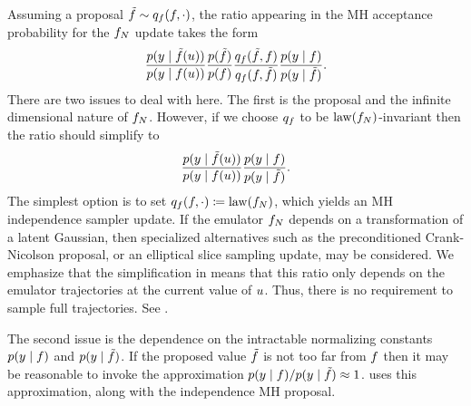 \documentclass[12pt]{article}
\begin{document}
 Assuming a proposal 
$\tilde{f} \sim q_{f}(f, \cdot)$, the ratio appearing in the MH acceptance
probability for the $f_{N}$ update takes the form 
\begin{align}
\frac{p(y \mid \tilde{f}(u))}{p(y \mid f(u))} \frac{p(\tilde{f})}{p(f)} 
\frac{q_{f}(\tilde{f}, f)}{q_{f}(f, \tilde{f})} \frac{p(y \mid f)}{p(y \mid \tilde{f})}.
\end{align}
There are two issues to deal with here. The first is the proposal and the infinite dimensional nature of $f_{N}$.
However, if we choose $q_f$ to be $\mathrm{law}(f_{N})$-invariant then the ratio should simplify to
\begin{align}
\frac{p(y \mid \tilde{f}(u))}{p(y \mid f(u))} \frac{p(y \mid f)}{p(y \mid \tilde{f})}.
\label{eq:MH-ratio-prior-invariant}
\end{align}
The simplest option is to set $q_f(f, \cdot) \coloneqq \mathrm{law}(f_{N})$, which yields an MH independence
sampler update. If the emulator $f_{N}$ depends on a transformation of a latent Gaussian, then 
specialized alternatives such as the preconditioned Crank-Nicolson proposal, or an elliptical slice
sampling update, may be considered. We emphasize that the simplification in 
 means that this ratio only depends on the emulator trajectories at the current 
value of $u$. Thus, there is no requirement to sample full trajectories. See .

The second issue is the dependence on the intractable normalizing constants 
$p(y \mid f)$ and $p(y \mid \tilde{f})$. 
If the proposed value $\tilde{f}$ is not too far from $f$ then it may be reasonable to invoke the 
approximation $p(y \mid f) / p(y \mid \tilde{f}) \approx 1$.
 uses this approximation, along with the independence MH proposal.
\end{document}
